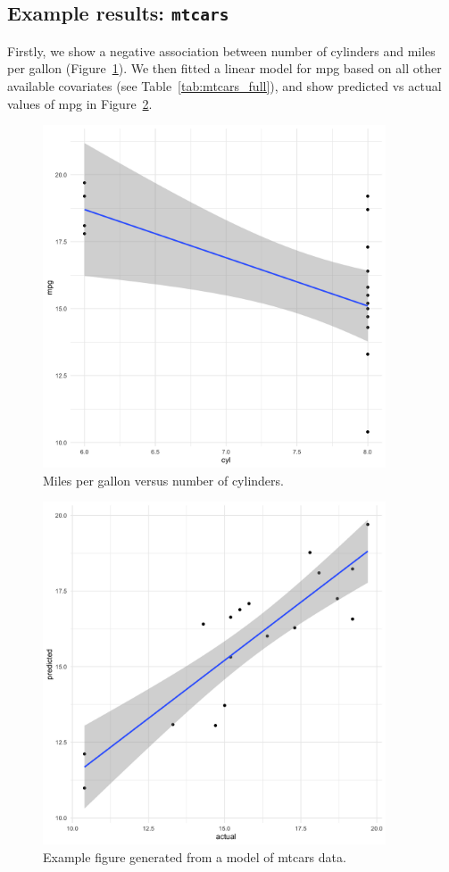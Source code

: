 \documentclass[12pt]{article}
\begin{document}
\subsection{Example results: \texttt{mtcars}}
Firstly, we show a negative association between number of cylinders and miles per gallon (Figure~\ref{fig:mt_cars_summary}). We then fitted a linear model for mpg based on all other available covariates (see Table~\ref{tab:mtcars_full}), and show predicted vs actual values of mpg in Figure~\ref{fig:mtcars_model}.
\begin{figure}[htbp]
    \centering
    \includegraphics[width=4in]{figures/mt_cars_summary.png}
    \caption{Miles per gallon versus number of cylinders.}
    \label{fig:mt_cars_summary}
\end{figure}

\begin{figure}[htbp]
    \centering
    \includegraphics[width=4in]{figures/mpg_model_actual_vs_predicted.png}
    \caption{Example figure generated from a model of mtcars data.}
    \label{fig:mtcars_model}
\end{figure}
\end{document}
